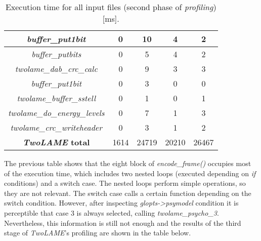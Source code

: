 \begin{table}[H]
\begin{tabular}{|c|c|c|c|c|}
    \hline
     \multicolumn{1}{|c|}{\textit{buffer\_put1bit}} & 0 & 10 & 4 & 2 \\
    \hline
     \multicolumn{1}{|c|}{\textit{buffer\_putbits}} & 0 & 5 & 4 & 2 \\
    \hline
     \multicolumn{1}{|c|}{\textit{twolame\_dab\_crc\_calc}} & 0 & 9 & 3 &  3 \\
    \hline
     \multicolumn{1}{|c|}{\textit{buffer\_put1bit}} & 0 & 3 & 0 &  0 \\
    \hline
     \multicolumn{1}{|c|}{\textit{twolame\_buffer\_sstell}} & 0 & 1 & 0 & 1  \\
    \hline
     \multicolumn{1}{|c|}{\textit{twolame\_do\_energy\_levels}} & 0 & 7 & 1 & 3  \\
    \hline
     \multicolumn{1}{|c|}{\textit{twolame\_crc\_writeheader}} & 0 & 3 & 1 &  2  \\ 
    \hline
    \multicolumn{1}{|c|}{\textbf{\textit{TwoLAME} total}}  & 1614 & 24719 & 20210 & 26467 \\ 
    \hline
    \end{tabular}
    \caption{Execution time for all input files (second phase of \textit{profiling}) [ms].}
    \label{profiling2}
\end{table}

The previous table shows that the eight block of \textit{encode\_frame()} occupies most of the execution time, which includes two nested loops (executed depending on \textit{if} conditions) and a switch case. The nested loops perform simple operations, so they are not relevant. The switch case calls a certain function depending on the switch condition. However, after inspecting \textit{glopts->psymodel} condition it is perceptible that case 3 is always selected, calling \textit{twolame\_psycho\_3}. Nevertheless, this information is still not enough and the results of the third stage of \textit{TwoLAME}'s profiling are shown in the table below.

